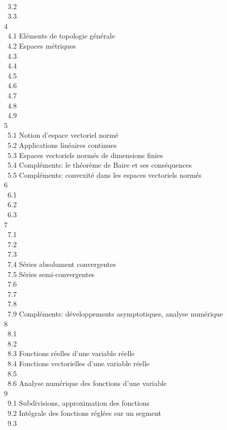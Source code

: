\documentclass[]{article}
\begin{document}
\\ ~3.2 
\\ ~3.3  \\ 4
 \\
~4.1 {Eléments de topologie
générale} \\ ~4.2 {Espaces
métriques} \\ ~4.3  \\ ~4.4
 \\ ~4.5
 \\ ~4.6
 \\ ~4.7
 \\ ~4.8
 \\
~4.9 
\\ 5  \\
~5.1 {Notion d'espace vectoriel
normé} \\ ~5.2 {Applications
linéaires continues} \\ ~5.3
{Espaces vectoriels normés de
dimensions finies} \\ ~5.4
{Compléments: le théorème de Baire
et ses conséquences} \\ ~5.5
{Compléments: convexité dans les
espaces vectoriels normés} \\ 6
 \\ ~6.1
 \\ ~6.2
 \\ ~6.3
 \\ 7
 \\ ~7.1
 \\ ~7.2
 \\ ~7.3
 \\
~7.4 {Séries absolument
convergentes} \\ ~7.5 {Séries
semi-convergentes} \\ ~7.6
 \\ ~7.7
 \\ ~7.8
 \\ ~7.9
{Compléments: développements
asymptotiques, analyse numérique} \\ 8
 \\
~8.1  \\ ~8.2
 \\ ~8.3
{Fonctions réelles d'une variable
réelle} \\ ~8.4 {Fonctions
vectorielles d'une variable réelle} \\ ~8.5
 \\ ~8.6
{Analyse numérique des fonctions
d'une variable} \\ 9  \\
~9.1 {Subdivisions, approximation
des fonctions} \\ ~9.2 {Intégrale
des fonctions réglées sur un segment} \\ ~9.3
\end{document}
